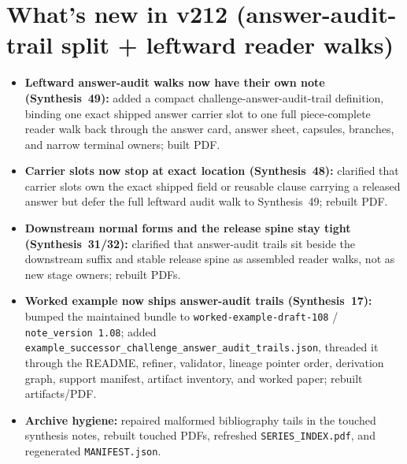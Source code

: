 \documentclass[11pt]{article}
\begin{document}
\section{What's new in v212 (answer-audit-trail split + leftward reader walks)}
\begin{itemize}[leftmargin=*]
\item \textbf{Leftward answer-audit walks now have their own note (Synthesis~49):} added a compact challenge-answer-audit-trail definition, binding one exact shipped answer carrier slot to one full piece-complete reader walk back through the answer card, answer sheet, capsules, branches, and narrow terminal owners; built PDF.
\item \textbf{Carrier slots now stop at exact location (Synthesis~48):} clarified that carrier slots own the exact shipped field or reusable clause carrying a released answer but defer the full leftward audit walk to Synthesis~49; rebuilt PDF.
\item \textbf{Downstream normal forms and the release spine stay tight (Synthesis~31/32):} clarified that answer-audit trails sit beside the downstream suffix and stable release spine as assembled reader walks, not as new stage owners; rebuilt PDFs.
\item \textbf{Worked example now ships answer-audit trails (Synthesis~17):} bumped the maintained bundle to \texttt{worked-example-draft-108} / \texttt{note\_version 1.08}; added \texttt{example\_successor\_challenge\_answer\_audit\_trails.json}, threaded it through the README, refiner, validator, lineage pointer order, derivation graph, support manifest, artifact inventory, and worked paper; rebuilt artifacts/PDF.
\item \textbf{Archive hygiene:} repaired malformed bibliography tails in the touched synthesis notes, rebuilt touched PDFs, refreshed \texttt{SERIES\_INDEX.pdf}, and regenerated \texttt{MANIFEST.json}.
\end{itemize}
\end{document}
